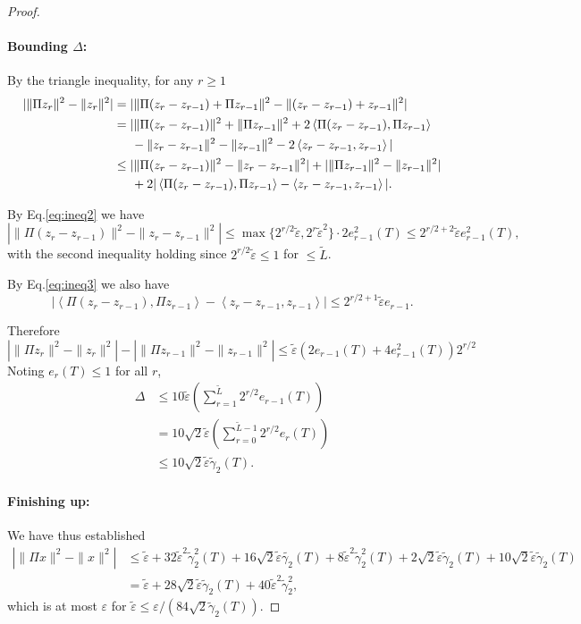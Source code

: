\documentclass[11pt]{article}
\newcommand{\inprod}[1]{\left\langle #1 \right\rangle}
\newcommand{\teps}{\tilde \varepsilon}
\newcommand{\eps}{\varepsilon}
\newcommand{\Equation}[1]{Eq.\:\eqref{eq:#1}}
\begin{document}
\begin{proof}
\paragraph{Bounding $\Delta$:}

By the triangle inequality, for any $r\ge 1$
\begin{align}
\nonumber |\|\Pi z_r\|^2 - \|z_r\|^2| &= |\|\Pi(z_r - z_{r-1}) + \Pi z_{r-1}\|^2 - \|(z_r - z_{r-1}) + z_{r-1}\|^2|\\
{}&= | \|\Pi(z_r - z_{r-1})\|^2 + \|\Pi z_{r-1}\|^2 + 2\inprod{\Pi(z_r - z_{r-1}), \Pi z_{r-1}}\\
\nonumber &\hspace{.2in}{} - \|z_r - z_{r-1}\|^2 - \|z_{r-1}\|^2 - 2\inprod{z_r - z_{r-1}, z_{r-1}}|\\
\nonumber {}&\le | \|\Pi(z_r - z_{r-1})\|^2 - \|z_r - z_{r-1}\|^2| + |\|\Pi z_{r-1}\|^2 - \|z_{r-1}\|^2|\\
&\hspace{.2in}{} + 2|\inprod{\Pi(z_r - z_{r-1}), \Pi z_{r-1}} - \inprod{z_r - z_{r-1}, z_{r-1}}| .
\end{align}

By \Equation{ineq2} we have 
$$
| \|\Pi(z_r - z_{r-1})\|^2 - \|z_r - z_{r-1}\|^2| \le \max\{2^{r/2}\teps, 2^r \teps^2\}\cdot 2e_{r-1}^2(T) \le 2^{r/2+2}\teps e_{r-1}^2(T) ,
$$
with the second inequality holding since $2^{r/2}\teps \le 1$ for $ \le \tilde{L}$.

By \Equation{ineq3} we also have
$$
|\inprod{\Pi(z_r - z_{r-1}), \Pi z_{r-1}} - \inprod{z_r - z_{r-1}, z_{r-1}}| \le 2^{r/2 + 1}\teps e_{r-1} .
$$

Therefore
$$
|\|\Pi z_r\|^2 - \|z_r\|^2| - |\|\Pi z_{r-1}\|^2 - \|z_{r-1}\|^2| \le \teps(2 e_{r-1}(T) + 4 e_{r-1}^2(T))2^{r/2}
$$
Noting $e_r(T) \le 1$ for all $r$,
\begin{align*}
\Delta &\le 10\teps\left(\sum_{r=1}^{\tilde{L}} 2^{r/2} e_{r-1}(T)\right) \\
{}&= 10\sqrt{2}\teps\left(\sum_{r=0}^{\tilde{L}-1} 2^{r/2} e_r(T)\right) \\
{}&\le 10\sqrt{2}\teps\tilde{\gamma}_2(T) .
\end{align*}

\paragraph{Finishing up:} We have thus established
\begin{align*}
|\|\Pi x\|^2 - \|x\|^2| &\le \teps + 32\teps^2 \tilde{\gamma}_2^2(T) + 16\sqrt{2}\teps\tilde{\gamma_2}(T) + 8\teps^2 \tilde{\gamma}_2^2(T) + 2\sqrt{2}\teps\tilde{\gamma}_2(T) + 10\sqrt{2}\teps \tilde{\gamma}_2(T)\\
{}&= \teps + 28\sqrt{2}\teps\tilde{\gamma}_2(T) + 40\teps^2\tilde{\gamma}_2^2 ,
\end{align*}
which is at most $\eps$ for $\teps \le \eps / (84\sqrt{2}\tilde{\gamma}_2(T))$.

\end{proof}
\end{document}

